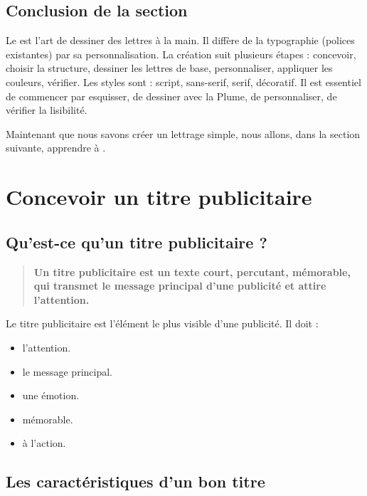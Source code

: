 \subsection*{Conclusion de la section}

Le  est l'art de dessiner des lettres à la main. Il diffère de la typographie (polices existantes) par sa personnalisation. La création suit plusieurs étapes : concevoir, choisir la structure, dessiner les lettres de base, personnaliser, appliquer les couleurs, vérifier. Les styles sont : script, sans-serif, serif, décoratif. Il est essentiel de commencer par esquisser, de dessiner avec la Plume, de personnaliser, de vérifier la lisibilité.

Maintenant que nous savons créer un lettrage simple, nous allons, dans la section suivante, apprendre à .

\section{Concevoir un titre publicitaire}

\subsection{Qu'est-ce qu'un titre publicitaire ?}

\begin{quote}
\textbf{Un titre publicitaire est un texte court, percutant, mémorable, qui transmet le message principal d'une publicité et attire l'attention.}
\end{quote}

Le titre publicitaire est l'élément le plus visible d'une publicité. Il doit :

\begin{itemize}
    \item {} l'attention.
    \item {} le message principal.
    \item {} une émotion.
    \item {} mémorable.
    \item {} à l'action.
\end{itemize}

\subsection{Les caractéristiques d'un bon titre}

